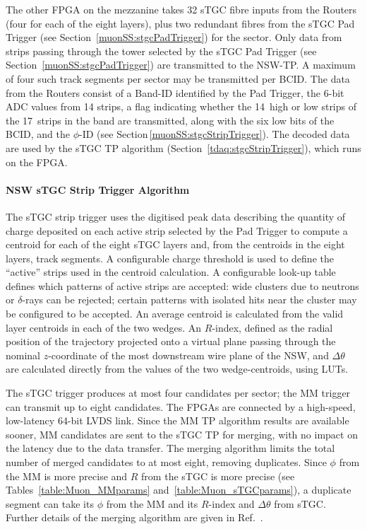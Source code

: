\documentclass[cernpreprint, atlasdraft=false, UKenglish,british,orcidlogo, texmf, orcidlogo]{atlasdoc}
\begin{document}
The other \gls{FPGA} on the mezzanine takes \num{32} \gls{sTGC} fibre inputs from the Routers (four for each of the eight layers), plus two redundant fibres from the \gls{sTGC} Pad Trigger (see Section~\ref{muonSS:stgcPadTrigger}) for the sector.
Only data from strips passing through the tower selected by the \gls{sTGC} Pad Trigger (see Section~\ref{muonSS:stgcPadTrigger}) are transmitted to the \gls{NSW-TP}. A maximum of four such track segments per sector may be transmitted per \gls{BCID}.
The data from the Routers consist of a Band-ID identified by the Pad Trigger, the 6-bit \gls{ADC} values from \num{14} strips, a flag indicating whether the 14~high or low strips of the 17~strips in the band are transmitted, along with the six low bits of the \gls{BCID}, and the $\phi$-ID (see Section\,\ref{muonSS:stgcStripTrigger}). The decoded data are used by the \gls{sTGC} \gls{TP} algorithm (Section~\ref{tdaq:stgcStripTrigger}), which runs on the \gls{FPGA}.
 
 
\paragraph{NSW sTGC Strip Trigger Algorithm \label{tdaq:stgcStripTrigger}}
The \gls{sTGC} strip trigger uses the digitised peak data describing the quantity of charge deposited
on each active strip selected by the Pad Trigger to compute a centroid for each of the eight \gls{sTGC} layers and, from the centroids in the eight layers, track segments.
A configurable charge threshold is used to define the ``active'' strips used in the centroid calculation.
A configurable look-up table defines which patterns of active strips are accepted: wide clusters due to neutrons or $\delta$-rays can be rejected;
certain patterns with isolated hits near the cluster may be configured to be accepted.
An average centroid is calculated from the valid layer centroids in each of the two wedges.
An $R$-index, defined as the radial position of the trajectory projected onto a virtual plane passing through the nominal $z$-coordinate of the most downstream wire plane of the \gls{NSW}, and $\Delta\theta$ are calculated directly from the values of the two wedge-centroids, using \glspl{LUT}.
 
The \gls{sTGC} trigger produces at most four candidates per sector; the \gls{MM} trigger can transmit up to eight candidates. The FPGAs are connected by a high-speed, low-latency 64-bit \gls{LVDS} link. Since the \gls{MM} \gls{TP} algorithm results are available sooner, \gls{MM} candidates are sent to the \gls{sTGC} \gls{TP} for merging, with no impact on the latency due to the data transfer.
The merging algorithm limits the total number of merged candidates to at most eight, removing duplicates.
Since $\phi$ from the \gls{MM} is more precise and $R$ from the \gls{sTGC} is more precise (see Tables~\ref{table:Muon_MMparams} and~\ref{table:Muon_sTGCparams}), a duplicate segment can take its $\phi$ from the \gls{MM} and its $R$-index and $\Delta\theta$ from \gls{sTGC}.
Further details of the merging algorithm are given in Ref.~\cite{NSWelx}.
 
\end{document}
